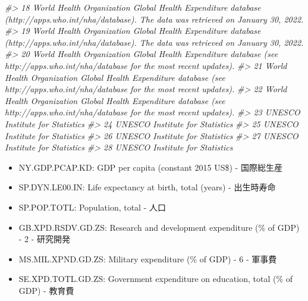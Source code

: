 \documentclass[
  xelatex, ja=standard]{bxjsbook}
\newenvironment{Shaded}{\begin{snugshade}}{\end{snugshade}}
\newcommand{\CommentTok}[1]{\textcolor[rgb]{0.56,0.35,0.01}{\textit{#1}}}
\theoremstyle{definition}
\theoremstyle{definition}
\theoremstyle{definition}
\theoremstyle{definition}
\theoremstyle{remark}
\begin{document}
\begin{Shaded}
\begin{Highlighting}[]
\CommentTok{\#\textgreater{} 18  World Health Organization Global Health Expenditure database (http://apps.who.int/nha/database). The data was retrieved on January 30, 2022.}
\CommentTok{\#\textgreater{} 19  World Health Organization Global Health Expenditure database (http://apps.who.int/nha/database). The data was retrieved on January 30, 2022.}
\CommentTok{\#\textgreater{} 20              World Health Organization Global Health Expenditure database (see http://apps.who.int/nha/database for the most recent updates).}
\CommentTok{\#\textgreater{} 21              World Health Organization Global Health Expenditure database (see http://apps.who.int/nha/database for the most recent updates).}
\CommentTok{\#\textgreater{} 22              World Health Organization Global Health Expenditure database (see http://apps.who.int/nha/database for the most recent updates).}
\CommentTok{\#\textgreater{} 23                                                                                                               UNESCO Institute for Statistics}
\CommentTok{\#\textgreater{} 24                                                                                                               UNESCO Institute for Statistics}
\CommentTok{\#\textgreater{} 25                                                                                                               UNESCO Institute for Statistics}
\CommentTok{\#\textgreater{} 26                                                                                                               UNESCO Institute for Statistics}
\CommentTok{\#\textgreater{} 27                                                                                                               UNESCO Institute for Statistics}
\CommentTok{\#\textgreater{} 28                                                                                                               UNESCO Institute for Statistics}
\end{Highlighting}
\end{Shaded}

\begin{itemize}
\item
  NY.GDP.PCAP.KD: GDP per capita (constant 2015 US\$) - 国際総生産
\item
  SP.DYN.LE00.IN: Life expectancy at birth, total (years) - 出生時寿命
\item
  SP.POP.TOTL: Population, total - 人口
\item
  GB.XPD.RSDV.GD.ZS: Research and development expenditure (\% of GDP) - 2 - 研究開発
\item
  MS.MIL.XPND.GD.ZS: Military expenditure (\% of GDP) - 6 - 軍事費
\item
  SE.XPD.TOTL.GD.ZS: Government expenditure on education, total (\% of GDP) - 教育費
\end{itemize}
\end{document}
